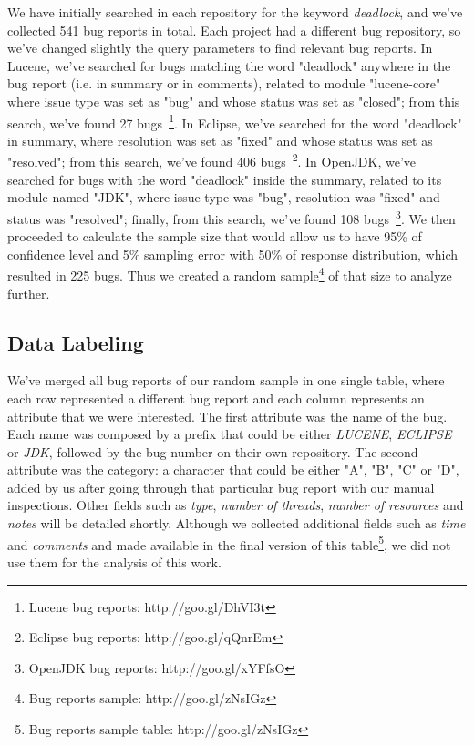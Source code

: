 We have initially searched in each repository for the keyword \emph{deadlock}, and we've collected 541 bug reports in total.
Each project had a different bug repository, so we've changed slightly the query parameters to find relevant bug reports.
In Lucene, we've searched for bugs matching the word "deadlock" anywhere in the bug report (i.e. in summary or in comments), related to module "lucene-core" where issue type was set as "bug" and whose status was set as "closed"; from this search, we've found 27 bugs~\footnote{Lucene bug reports: http://goo.gl/DhVI3t}.
In Eclipse, we've searched for the word "deadlock" in summary, where resolution was set as "fixed" and whose status was set as "resolved"; from this search, we've found 406 bugs~\footnote{Eclipse bug reports: http://goo.gl/qQnrEm}.
In OpenJDK, we've searched for bugs with the word "deadlock" inside the summary, related to its module named "JDK", where issue type was "bug", resolution was "fixed" and status was "resolved"; finally, from this search, we've found 108 bugs~\footnote{OpenJDK bug reports: http://goo.gl/xYFfsO}.
We then proceeded to calculate the sample size that would allow us to have 95\% of confidence level and 5\% sampling error with 50\% of response distribution, which resulted in 225 bugs.
Thus we created a random sample\footnote{Bug reports sample: http://goo.gl/zNsIGz} of that size to analyze further.

\subsection{Data Labeling}

We've merged all bug reports of our random sample in one single table, where each row represented a different bug report and each column represents an attribute that we were interested.
The first attribute was the name of the bug. Each name was composed by a prefix that could be either \emph{LUCENE}, \emph{ECLIPSE} or \emph{JDK}, followed by the bug number on their own repository.
The second attribute was the category: a character that could be either "A", "B", "C" or "D", added by us after going through that particular bug report with our manual inspections.
Other fields such as \emph{type}, \emph{number of threads}, \emph{number of resources} and \emph{notes} will be detailed shortly. Although we collected additional fields such as \emph{time} and \emph{comments} and made available in the final version of this table\footnote{Bug reports sample table: http://goo.gl/zNsIGz}, we did not use them for the analysis of this work.

